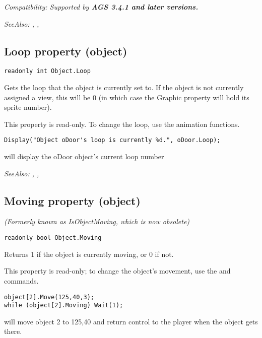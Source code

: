 \it{Compatibility:} Supported by \bf{AGS 3.4.1} and later versions.

\it{SeeAlso:} ,
,


\subsection{Loop property (object)}\label{Object.Loop}%

\begin{verbatim}
readonly int Object.Loop
\end{verbatim}
Gets the loop that the object is currently set to. If the object is not currently
assigned a view, this will be 0 (in which case the Graphic property will
hold its sprite number).

This property is read-only. To change the loop, use the animation functions.

\begin{verbatim}
Display("Object oDoor's loop is currently %d.", oDoor.Loop);
\end{verbatim}
will display the oDoor object's current loop number

\it{SeeAlso:} ,
,


\subsection{Moving property (object)}\label{Object.Moving}%

\it{(Formerly known as IsObjectMoving, which is now obsolete)}

\begin{verbatim}
readonly bool Object.Moving
\end{verbatim}
Returns 1 if the object is currently moving, or 0 if not.

This property is read-only; to change the object's movement, use the 
and  commands.

\begin{verbatim}
object[2].Move(125,40,3);
while (object[2].Moving) Wait(1);
\end{verbatim}
will move object 2 to 125,40 and return control to the player when the object gets there.

